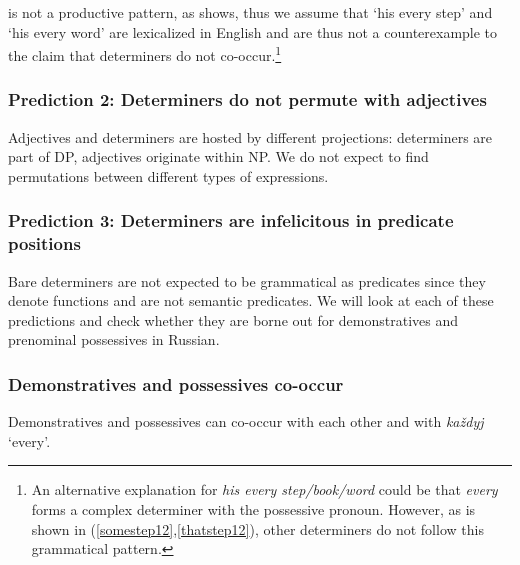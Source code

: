 \documentclass[output=paper]{langscibook}
\begin{document}
 is not a productive pattern, as  shows, thus we assume that `his every step' and `his every word' are lexicalized in English and are thus not a counter\-example to the claim that determiners do not co-occur.\footnote{An alternative explanation for \textit{his every step/book/word} could be that \textit{every} forms a complex determiner with the possessive pronoun. However, as is shown in (\ref{somestep12},\ref{thatstep12}), other determiners do not follow this grammatical pattern.}


\ea\label{false}
    \label{somestep12}
    \label{thatstep12}
\z\z

\subsubsection{Prediction 2: Determiners do not permute with adjectives}

\noindent Adjectives and determiners are hosted by different projections: determiners are part of DP, adjectives originate within NP. We do not expect to find permutations between different types of expressions.


\z

\subsubsection{Prediction 3: Determiners are infelicitous in predicate positions}

Bare determiners are not expected to be grammatical as predicates since they denote functions and are not semantic predicates. We will look at each of these predictions and check whether they are borne out for demonstratives and prenominal possessives in Russian. 


\subsubsection{Demonstratives and possessives co-occur}

Demonstratives and possessives can co-occur with each other and with \textit{každyj} `every'.

\end{document}
